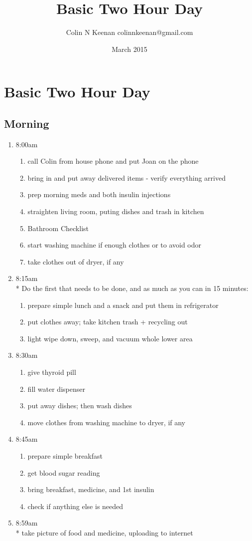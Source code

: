 \documentclass[12pt,letterpaper]{article}
\newcommand{\mytitle}{Basic Two Hour Day}
\begin{document}
\title{\mytitle{}}
\author{Colin N Keenan colinnkeenan@gmail.com}
\date{March 2015}
\section*{\mytitle{}}
\begin{multicols}{2} 
\subsection*{Morning}
\begin{enumerate}
	\item 8:00am
		\begin{enumerate}
			\item call Colin from house phone and put Joan on the phone
			\item bring in and put away delivered items - verify everything arrived
			\item prep morning meds and both insulin injections
			\item straighten living room, puting dishes and trash in kitchen
			\item Bathroom Checklist
			\item start washing machine if enough clothes or to avoid odor
			\item take clothes out of dryer, if any
		\end{enumerate}
	\item 8:15am \\*
		Do the first that needs to be done, and as much as you can in 15 minutes:
		\begin{enumerate}
			\item prepare simple lunch and a snack and put them in refrigerator
			\item put clothes away; take kitchen trash + recycling out
			\item light wipe down, sweep, and vacuum whole lower area
		\end{enumerate}
	\item 8:30am
		\begin{enumerate}
			\item give thyroid pill
			\item fill water dispenser
			\item put away dishes; then wash dishes
			\item move clothes from washing machine to dryer, if any
		\end{enumerate}
	\item 8:45am
		\begin{enumerate}
			\item prepare simple breakfast
			\item get blood sugar reading
			\item bring breakfast, medicine, and 1st insulin
			\item check if anything else is needed
		\end{enumerate}
	\item 8:59am \\*
		take picture of food and medicine, uploading to internet
\end{enumerate}
\vfill
\columnbreak


\end{multicols}
\end{document}
